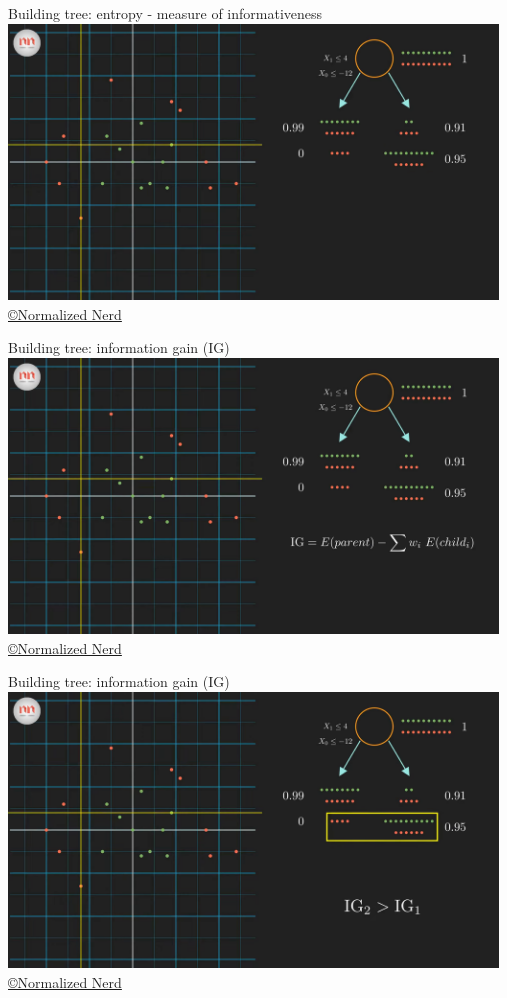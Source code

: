 \documentclass[handout, 10pt]{beamer}
\begin{document}
\begin{frame}{Building tree: entropy - measure of informativeness}
\hspace*{-1cm}\includegraphics[width=13cm]{dt/_7-52 screenshot}
{\tiny \href{https://www.youtube.com/watch?v=ZVR2Way4nwQ}{ \copyright Normalized Nerd}}
\end{frame}

\begin{frame}{Building tree: information gain (IG)}
\hspace*{-1cm}\includegraphics[width=13cm]{dt/_8-11 screenshot}
{\tiny \href{https://www.youtube.com/watch?v=ZVR2Way4nwQ}{ \copyright Normalized Nerd}}
\end{frame}

\begin{frame}{Building tree: information gain (IG)}
\hspace*{-1cm}\includegraphics[width=13cm]{dt/_8-32 screenshot}
{\tiny \href{https://www.youtube.com/watch?v=ZVR2Way4nwQ}{ \copyright Normalized Nerd}}
\end{frame}
\end{document}
